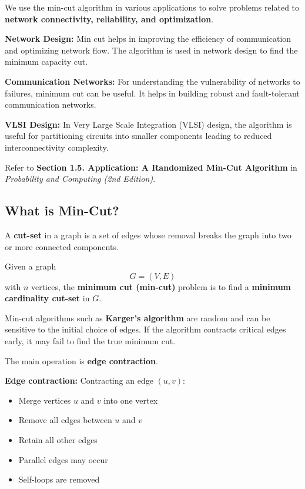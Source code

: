 \documentclass[12pt]{article}
\begin{document}
We use the min-cut algorithm in various applications to solve problems related to \textbf{network connectivity, reliability, and optimization}.

\textbf{Network Design:}  
Min cut helps in improving the efficiency of communication and optimizing network flow. The algorithm is used in network design to find the minimum capacity cut.

\textbf{Communication Networks:}  
For understanding the vulnerability of networks to failures, minimum cut can be useful. It helps in building robust and fault-tolerant communication networks.

\textbf{VLSI Design:}  
In Very Large Scale Integration (VLSI) design, the algorithm is useful for partitioning circuits into smaller components leading to reduced interconnectivity complexity.

Refer to \textbf{Section 1.5. Application: A Randomized Min-Cut Algorithm} in \textit{Probability and Computing (2nd Edition)}.

\subsection*{What is Min-Cut?}

A \textbf{cut-set} in a graph is a set of edges whose removal breaks the graph into two or more connected components.

Given a graph  
\[
G = (V, E)
\]
with \( n \) vertices, the \textbf{minimum cut (min-cut)} problem is to find a \textbf{minimum cardinality cut-set} in \( G \).

Min-cut algorithms such as \textbf{Karger’s algorithm} are random and can be sensitive to the initial choice of edges. If the algorithm contracts critical edges early, it may fail to find the true minimum cut.

The main operation is \textbf{edge contraction}.

\textbf{Edge contraction:}  
Contracting an edge \( (u,v) \):
\begin{itemize}
    \item Merge vertices \( u \) and \( v \) into one vertex
    \item Remove all edges between \( u \) and \( v \)
    \item Retain all other edges
    \item Parallel edges may occur
    \item Self-loops are removed
\end{itemize}
\end{document}
